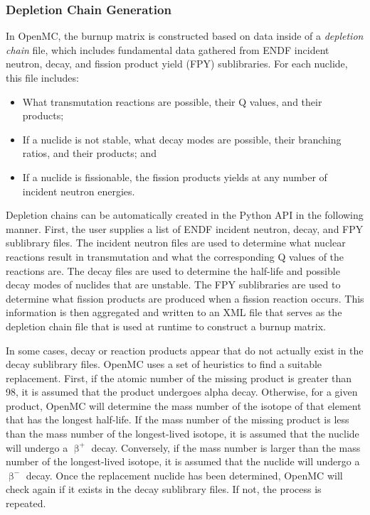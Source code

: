 \documentclass[3p,authoryear]{elsarticle}
\begin{document}
\subsubsection{Depletion Chain Generation}
\label{sec:depletion-chain}

In OpenMC, the burnup matrix is constructed based on data inside of a
\emph{depletion chain} file, which includes fundamental data gathered from ENDF
incident neutron, decay, and fission product yield (FPY) sublibraries. For each
nuclide, this file includes:
\begin{itemize}
  \item What transmutation reactions are possible, their Q values, and their products;
  \item If a nuclide is not stable, what decay modes are possible, their
  branching ratios, and their products; and
  \item If a nuclide is fissionable, the fission products yields at any number
  of incident neutron energies.
\end{itemize}

Depletion chains can be automatically created in the Python API in the following
manner. First, the user supplies a list of ENDF incident neutron, decay, and FPY
sublibrary files. The incident neutron files are used to determine what nuclear
reactions result in transmutation and what the corresponding Q values of the
reactions are. The decay files are used to determine the half-life and possible
decay modes of nuclides that are unstable. The FPY sublibraries are used to
determine what fission products are produced when a fission reaction occurs.
This information is then aggregated and written to an XML file that serves as
the depletion chain file that is used at runtime to construct a burnup matrix.

In some cases, decay or reaction products appear that do not actually exist in
the decay sublibrary files. OpenMC uses a set of heuristics to find a suitable
replacement. First, if the atomic number of the missing product is greater than
98, it is assumed that the product undergoes alpha decay. Otherwise, for a given
product, OpenMC will determine the mass number of the isotope of that element
that has the longest half-life. If the mass number of the missing product is
less than the mass number of the longest-lived isotope, it is assumed that the
nuclide will undergo a $\upbeta^+$ decay. Conversely, if the mass number is
larger than the mass number of the longest-lived isotope, it is assumed that the
nuclide will undergo a $\upbeta^-$ decay. Once the replacement nuclide has been
determined, OpenMC will check again if it exists in the decay sublibrary files.
If not, the process is repeated.
\end{document}
